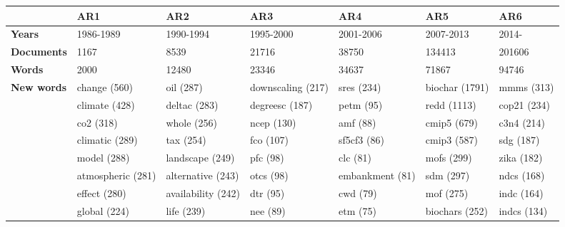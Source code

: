 \begin{tabular}{l p{1.8cm} p{1.8cm} p{1.8cm} p{1.8cm} p{1.8cm} p{1.8cm}} 
&\textbf{AR1} & \textbf{AR2} & \textbf{AR3} & \textbf{AR4} & \textbf{AR5} & \textbf{AR6}\\ \hline\textbf{Years} &1986-1989 & 1990-1994 & 1995-2000 & 2001-2006 & 2007-2013 & 2014-\\ 
\textbf{Documents} &1167 & 8539 & 21716 & 38750 & 134413 & 201606\\ 
\textbf{Words} &2000 & 12480 & 23346 & 34637 & 71867 & 94746\\ 
\textbf{New words} & change (560) & oil (287) & downscaling (217) & sres (234) & biochar (1791) & mmms (313)\\ & climate (428) & deltac (283) & degreesc (187) & petm (95) & redd (1113) & cop21 (234)\\ & co2 (318) & whole (256) & ncep (130) & amf (88) & cmip5 (679) & c3n4 (214)\\ & climatic (289) & tax (254) & fco (107) & sf5cf3 (86) & cmip3 (587) & sdg (187)\\ & model (288) & landscape (249) & pfc (98) & clc (81) & mofs (299) & zika (182)\\ & atmospheric (281) & alternative (243) & otcs (98) & embankment (81) & sdm (297) & ndcs (168)\\ & effect (280) & availability (242) & dtr (95) & cwd (79) & mof (275) & indc (164)\\ & global (224) & life (239) & nee (89) & etm (75) & biochars (252) & indcs (134)
\end{tabular}